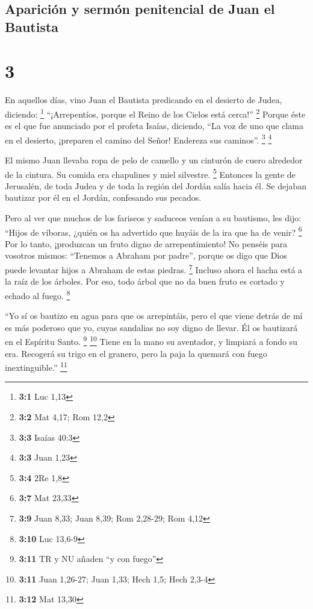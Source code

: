 \hypertarget{apariciuxf3n-y-sermuxf3n-penitencial-de-juan-el-bautista}{%
\subsection{Aparición y sermón penitencial de Juan el
Bautista}\label{apariciuxf3n-y-sermuxf3n-penitencial-de-juan-el-bautista}}

\hypertarget{section-2}{%
\section{3}\label{section-2}}

 En aquellos días, vino Juan el Bautista predicando en el
desierto de Judea, diciendo: \footnote{\textbf{3:1} Luc 1,13}
 ``¡Arrepentíos, porque el Reino de los Cielos está
cerca!'' \footnote{\textbf{3:2} Mat 4,17; Rom 12,2} 
Porque éste es el que fue anunciado por el profeta Isaías, diciendo,
``La voz de uno que clama en el desierto, ¡preparen el camino del Señor!
Endereza sus caminos''. \footnote{\textbf{3:3} Isaías 40:3} \footnote{\textbf{3:3}
  Juan 1,23}

 El mismo Juan llevaba ropa de pelo de camello y un
cinturón de cuero alrededor de la cintura. Su comida era chapulines y
miel silvestre. \footnote{\textbf{3:4} 2Re 1,8}  Entonces
la gente de Jerusalén, de toda Judea y de toda la región del Jordán
salía hacia él.  Se dejaban bautizar por él en el Jordán,
confesando sus pecados.

 Pero al ver que muchos de los fariseos y saduceos venían
a su bautismo, les dijo: ``Hijos de víboras, ¿quién os ha advertido que
huyáis de la ira que ha de venir? \footnote{\textbf{3:7} Mat 23,33}
 Por lo tanto, ¡produzcan un fruto digno de
arrepentimiento!  No penséis para vosotros mismos:
``Tenemos a Abraham por padre'', porque os digo que Dios puede levantar
hijos a Abraham de estas piedras. \footnote{\textbf{3:9} Juan 8,33; Juan
  8,39; Rom 2,28-29; Rom 4,12}  Incluso ahora el hacha
está a la raíz de los árboles. Por eso, todo árbol que no da buen fruto
es cortado y echado al fuego. \footnote{\textbf{3:10} Luc 13,6-9}

 ``Yo sí os bautizo en agua para que os arrepintáis, pero
el que viene detrás de mí es más poderoso que yo, cuyas sandalias no soy
digno de llevar. Él os bautizará en el Espíritu Santo. \footnote{\textbf{3:11}
  TR y NU añaden ``y con fuego''} \footnote{\textbf{3:11} Juan 1,26-27;
  Juan 1,33; Hech 1,5; Hech 2,3-4}  Tiene en la mano su
aventador, y limpiará a fondo su era. Recogerá su trigo en el granero,
pero la paja la quemará con fuego inextinguible.'' \footnote{\textbf{3:12}
  Mat 13,30}


